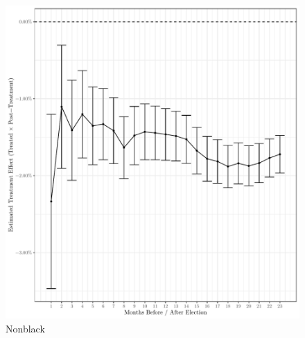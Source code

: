 \documentclass[
  12pt,
]{article}
\begin{document}
\begin{figure}[H]

{\centering \includegraphics{compile_files/figure-latex/non-black-primary-1} 

}

\caption{\label{fig:did-1}Nonblack}\label{fig:non-black-primary}
\end{figure}
\end{document}
